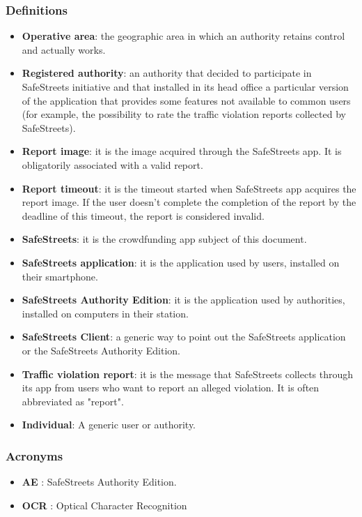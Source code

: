 \documentclass{article}
\begin{document}
		\subsubsection{Definitions}
		\begin{itemize}
			\item \textbf{Operative area}: the geographic area in which an authority retains  control and actually works.
			\item \textbf{Registered authority}: an authority that decided to participate in SafeStreets initiative and that installed in its head office a particular version of the application that provides some features not available to common users (for example, the possibility to rate the traffic violation reports collected by SafeStreets).
			\item \textbf{Report image}: it is the image acquired through the SafeStreets app. It is obligatorily associated with a valid report.
			\item \textbf{Report timeout}: it is the timeout started when SafeStreets app acquires the report image. If the user doesn't complete the completion of the report by the deadline of this timeout, the report is considered invalid.
			\item \textbf{SafeStreets}: it is the crowdfunding app subject of this document.
			\item \textbf{SafeStreets application}: it is the application used by users, installed on their smartphone.
			\item \textbf{SafeStreets Authority Edition}: it is the application used by authorities, installed on computers in their station.
			\item \textbf{SafeStreets Client}: a generic way to point out the SafeStreets application or the SafeStreets Authority Edition.
			\item \textbf{Traffic violation report}: it is the message that SafeStreets collects through its app from users who want to report an alleged violation. It is often abbreviated as "report".
			\item \textbf{Individual}: A generic user or authority.
		\end{itemize}
		\subsubsection{Acronyms}
		\begin{itemize}
			\item \textbf{AE} \label{AE}: SafeStreets Authority Edition.
			\item \textbf{OCR} \label{OCR}: Optical Character Recognition
		\end{itemize}
\end{document}
